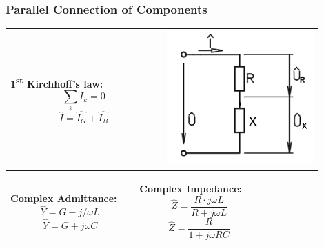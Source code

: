 \documentclass{beamer}
\begin{document}
	\begin{frame}
    \frametitle{Parallel Connection of Components}
		\begin{center}
		\begin{tabular}{m{0.45\linewidth} m{0.45\linewidth}}
			\textbf{1\textsuperscript{st} Kirchhoff's law:} $$\sum_k I_k = 0$$ $$\hat{I}= \hat{I_G} + \hat{I_B}$$& \includegraphics[scale=0.4]{obr11_obvodSeriovy.png}
		\end{tabular}
		\begin{tabular}{p{0.45\linewidth} p{0.45\linewidth}}
			\textbf{Complex Admittance:} $$\hat{Y} = G - j/\omega L$$ $$\hat{Y} = G + j\omega C$$& \textbf{Complex Impedance:} $$\hat{Z} = \frac{R\cdot j\omega L}{R+j\omega L}$$ $$\hat{Z} = \frac{R}{1+j\omega RC} $$
		\end{tabular}
		\end{center}
  \end{frame}
\end{document}
